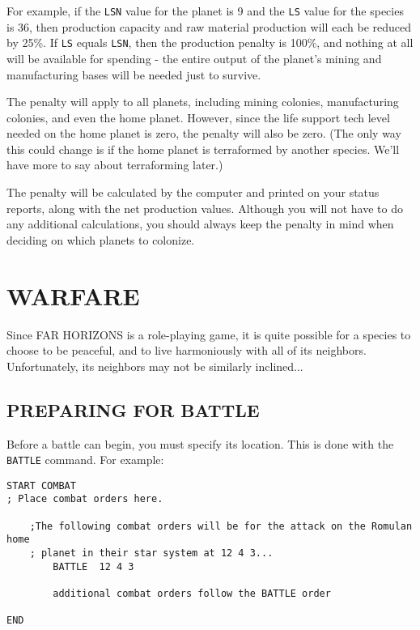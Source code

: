 \documentclass[10pt,titlepage]{article}
\begin{document}
For example, if the \texttt{LSN} value for the planet is 9 and the \texttt{LS} value for the
species is 36, then production capacity and raw material production will each
be reduced by 25\%.  If \texttt{LS} equals \texttt{LSN}, then the production penalty is 100\%,
and nothing at all will be available for spending - the entire output of the
planet's mining and manufacturing bases will be needed just to survive.

The penalty will apply to all planets, including mining colonies, manufacturing
colonies, and even the home planet.  However, since the life support tech level
needed on the home planet is zero, the penalty will also be zero.  (The only
way this could change is if the home planet is terraformed by another species.
We'll have more to say about terraforming later.)

The penalty will be calculated by the computer and printed on your status
reports, along with the net production values.  Although you will not have to
do any additional calculations, you should always keep the penalty in mind when
deciding on which planets to colonize.

\section{WARFARE}
\label{sec:warfare}

Since FAR HORIZONS is a role-playing game, it is quite possible for a species
to choose to be peaceful, and to live harmoniously with all of its neighbors.
Unfortunately, its neighbors may not be similarly inclined...


\subsection{PREPARING FOR BATTLE}
\label{sec:preparingforbattle}


Before a battle can begin, you must specify its location.  This is done with
the \texttt{BATTLE} command.  For example:

\begin{verbatim}
START COMBAT
; Place combat orders here.

    ;The following combat orders will be for the attack on the Romulan home
    ; planet in their star system at 12 4 3...
        BATTLE  12 4 3

        additional combat orders follow the BATTLE order

END\end{verbatim} 
\end{document}

